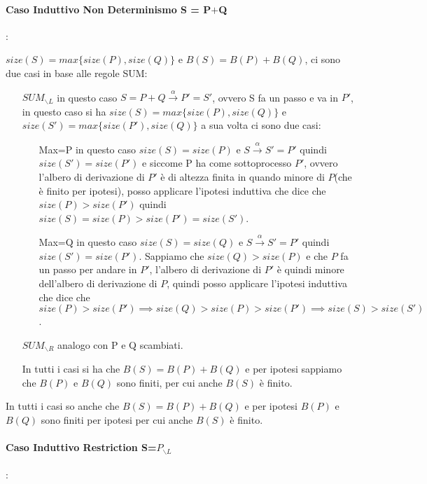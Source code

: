 \documentclass{article}
\newcommand{\pl}{P_{\backslash L}}
\newcommand{\passo}{\xrightarrow{\alpha}}
\begin{document}
\paragraph{Caso Induttivo Non Determinismo S = P$+$Q}:

$size(S) = max\{size(P), size(Q)\}$ e $B(S) = B(P) + B(Q)$, ci sono due casi in base alle regole SUM:

\begin{itemize}
    \item [$SUM_{\backslash L}$] in questo caso $S = P+Q \xrightarrow{\alpha} P' = S'$, ovvero S fa un passo e va in $P'$, in questo caso si ha $size(S) = max\{size(P), size(Q)\}$ e $size(S') = max\{size(P'), size(Q)\}$ a sua volta ci sono due casi:
    \begin{itemize}
        \item [Max=P] in questo caso $size(S) = size(P)$ e $S \passo S'=P'$ quindi $size(S')=size(P')$ e siccome P ha come sottoprocesso $P'$, ovvero l'albero di derivazione di $P'$ è di altezza finita in quando minore di $P$(che è finito per ipotesi), posso applicare l'ipotesi induttiva che dice che $size(P)>size(P')$ quindi $size(S)=size(P)>size(P')=size(S')$. 
                
        \item[Max=Q] in questo caso $size(S) = size(Q)$ e  $S \passo S'=P'$ quindi $size(S')=size(P')$. Sappiamo che $size(Q)>size(P)$ e che $P$ fa un passo per andare in $P'$, l'albero di derivazione di $P'$ è quindi minore dell'albero di derivazione di $P$, quindi posso applicare l'ipotesi induttiva che dice che $size(P)>size(P') \implies size(Q)>size(P)>size(P') \implies size(S)>size(S')$.
    \end{itemize}
    
    \item [$SUM_{\backslash R} $] analogo con P e Q scambiati.
    
In tutti i casi si ha che $ B(S) =B(P) + B(Q) $ e per ipotesi sappiamo che $ B(P) $ e $ B(Q) $ sono finiti, per cui anche $ B(S) $ è finito.
\end{itemize}

In tutti i casi so anche che $B(S)=B(P)+B(Q)$ e per ipotesi $B(P) $ e $B(Q)$ sono finiti per ipotesi per cui anche $B(S)$ è finito.

\paragraph{Caso Induttivo Restriction S=$\pl$}:
\end{document}
